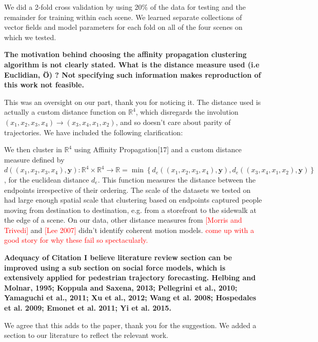 \documentclass[usenames,dvipsnames]{article}
\newcommand{\todo}[1]{\textcolor{red}{#1}}
\providecommand{\response}[1]{
\noindent
\noindent\colorbox{gray!20}{
\parbox{\textwidth}{
\setlength{\parskip}{.1in}
\setlength{\parindent}{.1in}
#1}
}
}
\begin{document}
\begin{enumerate}
\response{We did a 2-fold cross validation by using 20\% of the data for testing and the remainder for training within each scene. We learned separate collections of vector fields and model parameters for each fold on all of the four scenes on which we tested.}


\begin{item}
\textbf{The motivation behind choosing the affinity propagation clustering
algorithm is not clearly stated. 
What is the distance measure used (i.e Euclidian, \"{O}) ? Not specifying
such information makes reproduction of this work not feasible. }

This was an oversight on our part, thank you for noticing it. The distance used is actually a custom distance function on $\mathbb{R}^4$, which disregards the involution $(x_1, x_2, x_3, x_4) \to (x_3, x_4, x_1, x_2)$, and so doesn't care about parity of trajectories. We have included the following clarification:

\response{We then cluster in $\mathbb{R}^4$ using Affinity Propagation[17] and a custom distance measure defined by $d((x_1, x_2, x_3, x_4),\mathbf{y}) : \mathbb{R}^4 \times \mathbb{R}^4 \to \mathbb{R} = \min \left\{ d_e((x_1, x_2, x_3, x_4), \mathbf{y}), d_e((x_3, x_4, x_1, x_2), \mathbf{y}) \right\}$, for the euclidean distance $d_e$. This function measures the distance between the endpoints irrespective of their ordering. The scale of the datasets we tested on had large enough spatial scale that clustering based on endpoints captured people moving from destination to destination, e.g. from a storefront to the sidewalk at the edge of a scene. On our data, other distance measures from \todo{[Morris and Trivedi]} and \todo{[Lee 2007]} didn't identify coherent motion models. \todo{come up with a good story for why these fail so spectacularly.}}
	
\end{item}

\begin{item}
\textbf{Adequacy of Citation
I believe literature review section can be improved using a sub section
on social force models, which is extensively applied for pedestrian
trajectory forecasting. 
Helbing and Molnar, 1995; Koppula and Saxena, 2013; Pellegrini et al.,
2010; Yamaguchi et al., 2011; Xu et al., 2012; Wang et al. 2008;
Hospedales et al. 2009; Emonet et al. 2011; Yi et al. 2015.}
\end{item}

We agree that this adds to the paper, thank you for the suggestion. We added a section to our literature to reflect the relevant work.


\end{enumerate}
\end{document}
